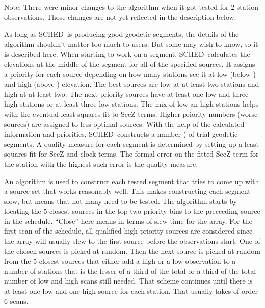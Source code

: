 \documentclass{report}
\newcommand{\schedb}{{\sc SCHED~}}
\begin{document}
Note:  There were minor changes to the algorithm when it got tested
for 2 station observations.  Those changes are not yet reflected in
the description below.

As long as \schedb is producing good geodetic segments, the details of
the algorithm shouldn't matter too much to users.  But some may wish
to know, so it is described here.  When starting to work on a segment,
\schedb calculates the elevations at the middle of the segment for all
of the specified sources.  It assigns a priority for each source
depending on how many stations see it at low (below ) and high (above ) elevation.  The best sources are low at at
least two stations and high at at least two.  The next priority
sources have at least one low and three high stations or at least
three low stations.  The mix of low an high stations helps with the
eventual least squares fit to SecZ terms.  Higher priority numbers
(worse sources) are assigned to less optimal sources.  With the help
of the calculated information and priorities, \schedb constructs a
number ( of trial geodetic
segments.  A quality measure for each segment is determined by setting
up a least squares fit for SecZ and clock terms.  The formal error on
the fitted SecZ term for the station with the highest such error is
the quality measure.

An algorithm is used to construct each tested segment that tries to
come up with a source set that works reasonably well.  This makes
constructing each segment slow, but means that not many need to be
tested.  The algorithm starts by locating the 5 closest sources in the
top two priority bins to the preceeding source in the schedule.
``Close'' here means in terms of slew time for the array.  For the
first scan of the schedule, all qualified high priority sources
are considered since the array will usually slew to the first source
before the observations start.  One of the chosen sources is picked at
random.  Then the next source is picked at random from the 5 closest
sources that either add a high or a low observation to a number of stations
that is the lesser of a third of the total or a third of the total number
of low and high scans still needed.  That scheme continues until
there is at least one low and one high source for each station.  That usually
takes of order 6 scans.
\end{document}
